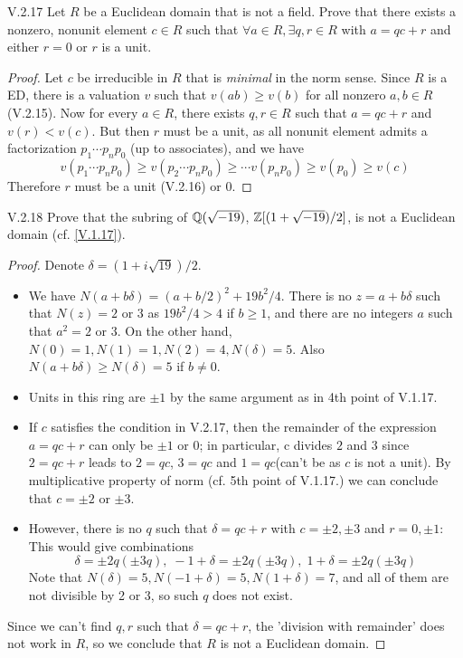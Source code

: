 \begin{problem}{V.2.17}
Let $R$ be a Euclidean domain that is not a field. Prove that there exists a nonzero, nonunit element $c \in R$ such that $\forall a \in R, \exists q,r \in R$ with $a = qc+r$ and either $r = 0$ or $r$ is a unit.
\end{problem}
\begin{proof}
Let $c$ be irreducible in $R$ that is \emph{minimal} in the norm sense. Since $R$ is a ED, there is a valuation $v$ such that $v(ab) \geq v(b)$ for all nonzero $a,b \in R$ (V.2.15). Now for every $a \in R$, there exists $q,r \in R$ such that $a = qc+r$ and $v(r) < v(c)$. But then $r$ must be a unit, as all nonunit element admits a factorization $p_1\cdots p_np_0$ (up to associates), and we have
\[
v(p_1\cdots p_np_0) \geq v(p_2\cdots p_np_0) \geq \cdots v(p_np_0) \geq v(p_0) \geq v(c)
\]
Therefore $r$ must be a unit (V.2.16) or $0$.
\end{proof}

\begin{problem}{V.2.18}
Prove that the subring of $\mathbb{Q}(\sqrt{-19})$, $\mathbb{Z}[(1+\sqrt{-19})/2]$, is not a Euclidean domain (cf. \ref{V.1.17}).
\end{problem}
\begin{proof}
Denote $\delta = (1+i\sqrt{19})/2$.
\begin{itemize}
	\setlength\itemsep{0pt}
	\item We have $N(a+b\delta) = (a+b/2)^2 + 19b^2/4$. There is no $z = a+b\delta$ such that $N(z) = 2$ or $3$ as $19b^2/4 > 4$ if $b \geq 1$, and there are no integers $a$ such that $a^2 = 2$ or $3$. On the other hand, $N(0) = 1, N(1) = 1, N(2) = 4, N(\delta) = 5$. Also $N(a+b\delta) \geq N(\delta) = 5$ if $b \neq 0$.
	\item Units in this ring are $\pm 1$ by the same argument as in 4th point of V.1.17.
	\item If $c$ satisfies the condition in V.2.17, then the remainder of the expression $a = qc + r$ can only be $\pm 1$ or $0$; in particular, c divides $2$ and $3$ since $2 = qc + r$ leads to $2 = qc$, $3 = qc$ and $1 = qc$(can't be as $c$ is not a unit). By multiplicative property of norm (cf. 5th point of V.1.17.) we can conclude that $c = \pm 2$ or $\pm 3$.
	\item However, there is no $q$ such that $\delta = qc + r$ with $c = \pm 2, \pm 3$ and $r = 0, \pm 1$: This would give combinations
	\[
	\delta = \pm 2q(\pm 3q), \; -1+\delta = \pm 2q(\pm 3q), \; 1+\delta = \pm 2q(\pm 3q)
	\]
	Note that $N(\delta) = 5, N(-1+\delta) = 5, N(1+\delta) = 7$, and all of them are not divisible by 2 or 3, so such $q$ does not exist.
\end{itemize}
Since we can't find $q,r$ such that $\delta = qc+r$, the 'division with remainder' does not work in $R$, so we conclude that $R$ is not a Euclidean domain.
\end{proof}

